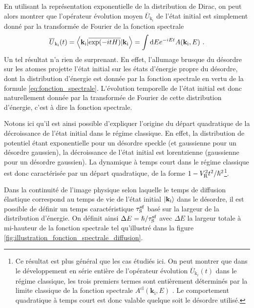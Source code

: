En utilisant la représentation exponentielle de la distribution de Dirac, on peut alors montrer que l'opérateur évolution moyen $\overline{U}_{\mathrm{k}_i}$ de l'état initial est simplement donné par la transformée de Fourier de la fonction spectrale
\begin{equation}
\overline{U}_{\mathrm{k}_{\mathrm{i}}}(t)=\left\langle \mathbf{k}_{\mathrm{i}} | \overline{\exp(-itH)}  | \mathbf{k}_{\mathrm{i}} \right\rangle = \int{\mathop{}\mathopen{}\mathrm{d}E e^{-iEt} A(\mathbf{k}_{\mathrm{i}},E)} \text{ .}
\end{equation}
Un tel résultat n'a rien de surprenant. En effet, l'allumage brusque du désordre sur les atomes projette l'état initial sur les états d'énergie propre du désordre, dont la distribution d'énergie est donnée par la fonction spectrale en vertu de la formule \ref{eq:fonction_spectrale}. L'évolution temporelle de l'état initial est donc naturellement donnée par la transformée de Fourier de cette distribution d'énergie, c'est à dire la fonction spectrale. 

Notons ici qu'il est ainsi possible d'expliquer l'origine du départ quadratique de la décroissance de l'état initial dans le régime classique. En effet, la distribution de potentiel étant exponentielle pour un désordre speckle (et gaussienne pour un désordre gaussien), la décroissance de l'état initial est lorentzienne (gaussienne pour un désordre gaussien). La dynamique à temps court dans le régime classique est donc caractérisée par un départ quadratique, de la forme $1-V_{\mathrm{R}}^2t^2/\hslash^2$\footnote{Ce résultat est plus général que les cas étudiés ici. On peut montrer que dans le développement en série entière de l'opérateur évolution $\overline{U}_{\mathrm{k}_i}(t)$ dans le régime classique, les trois premiers termes sont entièrement déterminés par la limite classique de la fonction spectrale $A^{\mathrm{cl}}(\mathbf{k}_{\mathrm{i}},E)$ \citep{trappe2015semiclassical}. Le comportement quadratique à temps court est donc valable quelque soit le désordre utilisé. }.

Dans la continuité de l'image physique selon laquelle le temps de diffusion élastique correspond au temps de vie de l'état initial $\left| \mathbf{k}_{\mathrm{i}} \right\rangle$ dans le désordre, il est possible de définir un temps caractéristique $\tau_{\mathrm{S}}^{\mathrm{sf}}$ basé sur la largeur de la distribution d'énergie. On définit ainsi $\Delta E = \hslash/\tau_{\mathrm{S}}^{\mathrm{sf}}$ avec $\Delta E$ la largeur totale à mi-hauteur de la fonction spectrale tel qu'illustré dans la figure \ref{fig:illustration_fonction_spectrale_diffusion}. 

